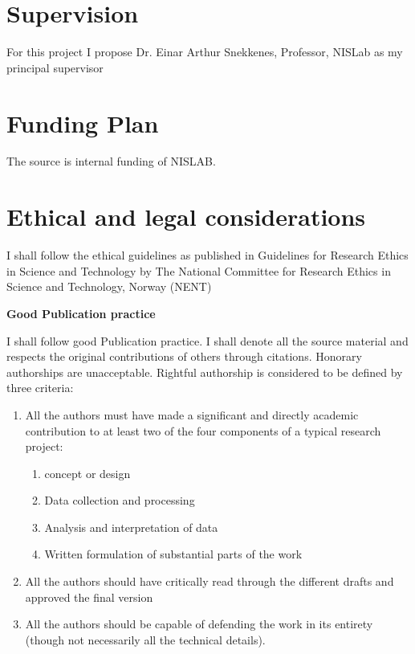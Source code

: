 \documentclass[a4paper,twoside,10pt]{report}
\begin{document}
\chapter{Supervision}\label{supervision}
For this project I propose Dr. Einar Arthur Snekkenes, Professor, NISLab as my principal supervisor

\chapter{Funding Plan}\label{Fund}
The source is internal funding of NISLAB.

\chapter{Ethical and legal considerations}\label{Ethics}

I shall follow the ethical guidelines as published in Guidelines for Research Ethics in Science and Technology by The National Committee for Research Ethics in Science and Technology, Norway (NENT) 

\textbf{Good Publication practice}

I shall follow good Publication practice. I shall denote all the source material and respects the original contributions of others through citations. Honorary authorships are unacceptable. Rightful authorship is considered to be defined by three criteria:

\begin{enumerate}
	\item All the authors must have made a significant and directly academic contribution to at least two of the four components of a typical research project:	
	
	\begin{enumerate}
		\item concept or design
		
		\item Data collection and processing
		
		\item Analysis and interpretation of data
		
		\item Written formulation of substantial parts of the work
		
	\end{enumerate}
\item All the authors should have critically read through the different drafts and approved the final version

\item All the authors should be capable of defending the work in its entirety (though not necessarily all the technical details).

\end{enumerate}
\end{document}
